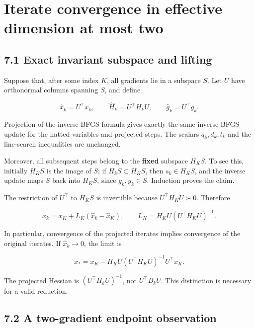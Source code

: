 \documentclass[10pt,oneside,openany]{book}
\theoremstyle{remark}\newtheorem{remark}{Remark}[chapter]
\begin{document}
\setcounter{section}{6}
\setcounter{theorem}{0}
\setcounter{lemma}{0}
\setcounter{corollary}{0}
\setcounter{proposition}{0}
\setcounter{remark}{0}
\setcounter{equation}{0}
\section{Iterate convergence in effective dimension at most
two}\label{H:iterate-convergence-in-effective-dimension-at-most-two}

\subsection{7.1 Exact invariant subspace and
lifting}\label{H:exact-invariant-subspace-and-lifting}

Suppose that, after some index \(K\), all gradients lie in a subspace
\(S\). Let \(U\) have orthonormal columns spanning \(S\), and define

\[
\widehat x_k=U^\top x_k,\qquad
\widehat H_k=U^\top H_kU,\qquad
\widehat g_k=U^\top g_k.
\]

Projection of the inverse-BFGS formula gives exactly the same
inverse-BFGS update for the hatted variables and projected steps. The
scalars \(q_k,d_k,t_k\) and the line-search inequalities are unchanged.

Moreover, all subsequent steps belong to the \textbf{fixed} subspace
\(H_KS\). To see this, initially \(H_KS\) is the image of \(S\); if
\(H_kS\subset H_KS\), then \(s_k\in H_KS\), and the inverse update maps
\(S\) back into \(H_KS\), since \(g_k,y_k\in S\). Induction proves the
claim.

The restriction of \(U^\top\) to \(H_KS\) is invertible because
\(U^\top H_KU\succ0\). Therefore

\[
\boxed{
x_k=x_K+L_K(\widehat x_k-\widehat x_K),\qquad
L_K=H_KU(U^\top H_KU)^{-1}.
}
\tag{H.7.1}
\]

In particular, convergence of the projected iterates implies convergence
of the original iterates. If \(\widehat x_k\to0\), the limit is

\[
\boxed{x_*=x_K-H_KU(U^\top H_KU)^{-1}U^\top x_K.}
\tag{H.7.2}
\]

The projected Hessian is \((U^\top H_kU)^{-1}\), not \(U^\top B_kU\).
This distinction is necessary for a valid reduction.

\subsection{7.2 A two-gradient endpoint
observation}\label{H:a-two-gradient-endpoint-observation}
\end{document}
